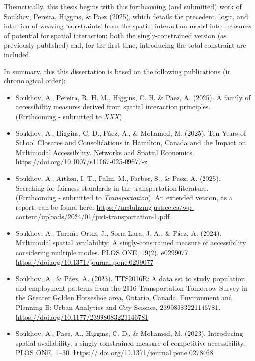 \documentclass[
11pt, %
oneside, %
english, %
singlespacing, %
]{macthesis} %
\def\tightlist{}
\begin{document}
Thematically, this thesis begins with this forthcoming (and submitted) work of Soukhov, Pereira, Higgins, \& Paez (2025), which details the precedent, logic, and intuition of weaving `constraints' from the spatial interaction model into measures of potential for spatial interaction: both the singly-constrained version (as previously published) and, for the first time, introducing the total constraint are included.

In summary, this this dissertation is based on the following publications (in chronological order):

\begin{itemize}
\tightlist
\item
  Soukhov, A., Pereira, R. H. M., Higgins, C. H. \& Paez, A. (2025). A family of accessibility measures derived from spatial interaction principles. (Forthcoming - submitted to \emph{XXX}).
\item
  Soukhov, A., Higgins, C. D., Páez, A., \& Mohamed, M. (2025). Ten Years of School Closures and Consolidations in Hamilton, Canada and the Impact on Multimodal Accessibility. Networks and Spatial Economics. \url{https://doi.org/10.1007/s11067-025-09677-z}
\item
  Soukhov, A., Aitken, I. T., Palm, M., Farber, S., \& Paez, A. (2025). Searching for fairness standards in the transportation literature. (Forthcoming - submitted to \emph{Transportation}). An extended version, as a report, can be found here: \url{https://mobilizingjustice.ca/wp-content/uploads/2024/01/just-transportation-1.pdf}
\item
  Soukhov, A., Tarriño-Ortiz, J., Soria-Lara, J. A., \& Páez, A. (2024). Multimodal spatial availability: A singly-constrained measure of accessibility considering multiple modes. PLOS ONE, 19(2), e0299077. \url{https://doi.org/10.1371/journal.pone.0299077}
\item
  Soukhov, A., \& Páez, A. (2023). TTS2016R: A data set to study population and employment patterns from the 2016 Transportation Tomorrow Survey in the Greater Golden Horseshoe area, Ontario, Canada. Environment and Planning B: Urban Analytics and City Science, 23998083221146781. \url{https://doi.org/10.1177/23998083221146781}
\item
  Soukhov, A., Paez, A., Higgins, C. D., \& Mohamed, M. (2023). Introducing spatial availability, a singly-constrained measure of competitive accessibility. PLOS ONE, 1--30. \url{https://} doi.org/10.1371/journal.pone.0278468
\end{itemize}
\end{document}
